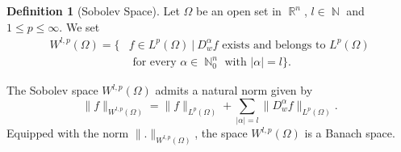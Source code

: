 \documentclass[12pt]{article}
\theoremstyle{definition}
\newtheorem{definition}{Definition}
\DeclareMathOperator\rr{\mathbb{R}}
\DeclareMathOperator\nn{\mathbb{N}}
\begin{document}
\begin{definition}[Sobolev Space]
Let $\Omega$ be an open set in $\rr^n$, $l \in \nn$ and $1\le p\le \infty$. We set
	\begin{align*} W^{l,p}(\Omega)=\{& f \in L^p(\Omega) \ | \ D^\alpha_w f \text{ exists and belongs to } L^p(\Omega)  \\
	 &\text{ for every } \alpha \in \nn^n_0 \text{ with } |\alpha|=l\}.
	\end{align*}
\end{definition}
The Sobolev space $W^{l,p}(\Omega)$ admits a natural norm given by
\[ \|f\|_{W^{l,p}(\Omega)}=\|f\|_{L^p(\Omega)}+\sum_{|\alpha|=l}\|D^\alpha_wf\|_{L^p(\Omega)}.\]
Equipped with the norm $\| .\|_{W^{l,p}(\Omega)}$, the space $W^{l,p}(\Omega)$ is a Banach space. \\\\
\end{document}

